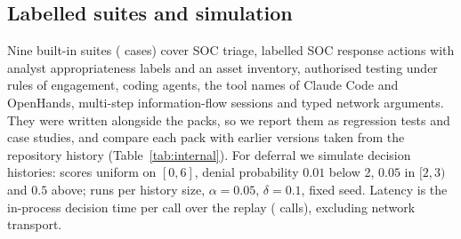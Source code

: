 \subsection{Labelled suites and simulation}
Nine built-in suites (\InCases{} cases) cover SOC triage, labelled SOC response actions with analyst appropriateness labels and an asset inventory, authorised testing under rules of engagement, coding agents, the tool names of Claude Code and OpenHands, multi-step information-flow sessions and typed network arguments. They were written alongside the packs, so we report them as regression tests and case studies, and compare each pack with earlier versions taken from the repository history (Table~\ref{tab:internal}). For deferral we simulate decision histories: scores uniform on $[0,6]$, denial probability $0.01$ below 2, $0.05$ in $[2,3)$ and $0.5$ above; \SimRuns{} runs per history size, $\alpha=0.05$, $\delta=0.1$, fixed seed. Latency is the in-process decision time per call over the replay (\LatN{} calls), excluding network transport.
